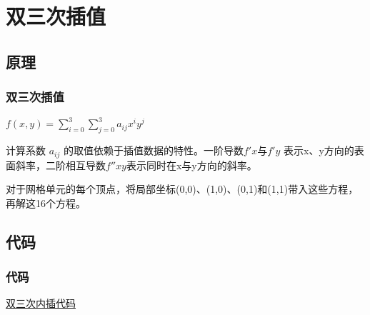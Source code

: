 \documentclass[notheorems,serif,table,compress]{beamer}  %
\begin{document}
\section{双三次插值}

\subsection{原理}
\begin{frame}
\frametitle{双三次插值}
    	$f(x,y)=\sum _{i=0}^{3}\sum _{j=0}^{3}a_{ij}x^{i}y^{j}$

\mbox{}

计算系数 $a_{ij}$ 的取值依赖于插值数据的特性。一阶导数$f'x$与$f'y$ 表示x、y方向的表面斜率，二阶相互导数$f''xy$表示同时在x与y方向的斜率。

\mbox{}

对于网格单元的每个顶点，将局部坐标(0,0)、(1,0)、(0,1)和(1,1)带入这些方程，再解这16个方程。
\end{frame}

\subsection{代码}
\begin{frame}
\frametitle{代码}
\href{code/bicubic.cpp}{双三次内插代码}

\end{frame}
\end{document}
